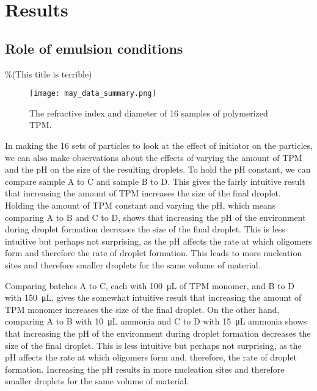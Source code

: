 \section{Results}



\subsection{Role of emulsion conditions}
\%(This title is terrible)


\begin{figure}
    \centering
    \texttt{[image: may\_data\_summary.png]}
    \caption{The refractive index and diameter of 16 samples of 
    polymerized TPM.}
    \label{fig:initiator_data}
\end{figure}

In making the \si{16} sets of particles to look at the effect of initiator on 
the particles, we can also make observations about the effects of varying 
the amount of TPM and the pH on the size of the resulting droplets. To hold 
the pH constant, we can compare sample A to C and sample B to D. This gives 
the fairly intuitive result that increasing the amount of TPM increases the 
size of the final droplet. Holding the amount of TPM constant and varying 
the pH, which means comparing A to B and C to D, shows that increasing the 
pH of the environment during droplet formation decreases the size of the 
final droplet. This is less intuitive but perhaps not surprising, as the pH 
affects the rate at which oligomers form and therefore the rate of droplet 
formation. This leads to more nucleation sites and therefore smaller droplets 
for the same volume of material. 

Comparing batches A to C, each with \SI{100}{\micro \liter} of TPM monomer, and B to D with
\SI{150}{\micro \liter}, gives the somewhat intuitive result that increasing the amount of TPM
monomer increases the size of the final droplet. On the other hand, comparing A to B with
\SI{10}{\micro \liter} ammonia and C to D with \SI{15}{\micro \liter} ammonia shows that
increasing the pH of the environment during droplet formation decreases the size of the 
final droplet. This is less intuitive but perhaps not surprising, as the pH 
affects the rate at which oligomers form and, therefore, the rate of droplet 
formation. Increasing the pH results in more nucleation sites and therefore smaller droplets 
for the same volume of material. 

